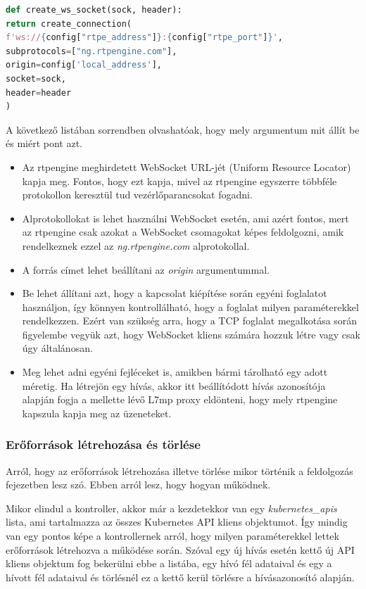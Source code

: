 \begin{lstlisting}[language=python, caption=WebSocket foglalat létrehozása, label=lst:wssock]
def create_ws_socket(sock, header):
return create_connection(
f'ws://{config["rtpe_address"]}:{config["rtpe_port"]}',
subprotocols=["ng.rtpengine.com"],
origin=config['local_address'],
socket=sock,
header=header
)
\end{lstlisting}

A következő listában sorrendben olvashatóak, hogy mely argumentum mit állít be és miért
pont azt.

\begin{itemize}
	\item Az rtpengine meghirdetett WebSocket URL-jét (Uniform Resource Locator) kapja 
	meg. Fontos, hogy ezt kapja, mivel az rtpengine egyszerre többféle protokollon keresztül tud 
	vezérlőparancsokat fogadni.
	\item Alprotokollokat is lehet használni WebSocket esetén, ami azért fontos, mert
	az rtpengine csak azokat a WebSocket csomagokat képes feldolgozni, amik rendelkeznek
	ezzel az \textit{ng.rtpengine.com} alprotokollal.
	\item A forrás címet lehet beállítani az \textit{origin} argumentummal. 
	\item Be lehet állítani azt, hogy a kapcsolat kiépítése során egyéni foglalatot
	használjon, így könnyen kontrollálható, hogy a foglalat milyen paraméterekkel 
	rendelkezzen. Ezért van szükség arra, hogy a TCP foglalat megalkotása során
	figyelembe vegyük azt, hogy WebSocket kliens számára hozzuk létre vagy csak úgy
	általánosan.
	\item Meg lehet adni egyéni fejléceket is, amikben bármi tárolható egy adott
	méretig. Ha létrejön egy hívás, akkor itt beállítódott hívás azonosítója alapján
	fogja a mellette lévő L7mp proxy eldönteni, hogy mely rtpengine kapszula kapja
	meg az üzeneteket.
\end{itemize}

\subsubsection{Erőforrások létrehozása és törlése}

Arról, hogy az erőforrások létrehozása illetve törlése mikor történik a feldolgozás
fejezetben lesz szó. Ebben arról lesz, hogy hogyan működnek.

Mikor elindul a kontroller, akkor már a kezdetekkor van egy \textit{kubernetes\_apis}
lista, ami tartalmazza az összes Kubernetes API kliens objektumot. Így mindig van egy
pontos képe a kontrollernek arról, hogy milyen paraméterekkel lettek erőforrások 
létrehozva a működése során. Szóval egy új hívás esetén kettő új API kliens objektum 
fog bekerülni ebbe a listába, egy hívó fél adataival és egy a hívott fél adataival 
és törlésnél ez a kettő kerül törlésre a hívásazonosító alapján. 

